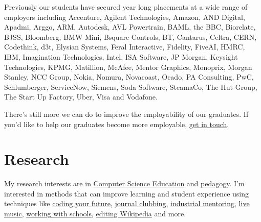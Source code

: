 \documentclass[
  12pt,
]{book}
\begin{document}
Previously our students have secured year long placements at a wide range of employers including Accenture, Agilent Technologies, Amazon, AND Digital, Apadmi, Arggo, ARM, Autodesk, AVL Powertrain, BAML, the BBC, Biorelate, BJSS, Bloomberg, BMW Mini, Bsquare Controls, BT, Cantarus, Celtra, CERN, Codethink, d3t, Elysian Systems, Feral Interactive, Fidelity, FiveAI, HMRC, IBM, Imagination Technologies, Intel, ISA Software, JP Morgan, Keysight Technologies, KPMG, Matillion, McAfee, Mentor Graphics, Monoprix, Morgan Stanley, NCC Group, Nokia, Nomura, Novacoast, Ocado, PA Consulting, PwC, Schlumberger, ServiceNow, Siemens, Soda Software, SteamaCo, The Hut Group, The Start Up Factory, Uber, Visa and Vodafone.

There's still more we can do to improve the employability of our graduates. If you'd like to help our graduates become more employable, \href{Contact}{get in touch}.

\hypertarget{research}{%
\chapter{Research}\label{research}}

My research interests are in \href{https://en.wikipedia.org/wiki/Computer_science_education}{Computer Science Education} and \href{https://en.wikipedia.org/wiki/Pedagogy}{pedagogy}. \citep{CERhandbook, JohnBiggs2011, Fry2014} I'm interested in methods that can improve learning and student experience using techniques like \href{https://www.cdyf.me}{coding your future}, \href{https://sigcse.cs.manchester.ac.uk/}{journal clubbing}, \href{https://www.cs.manchester.ac.uk/connect/business-engagement/industrial-mentoring/}{industrial mentoring}, \protect\hyperlink{tuningcomplete}{live music}, \href{https://personalpages.manchester.ac.uk/staff/duncan.hull/coding-their-future.html}{working with schools}, \protect\hyperlink{wikipedia}{editing Wikipedia} and more.
\end{document}
